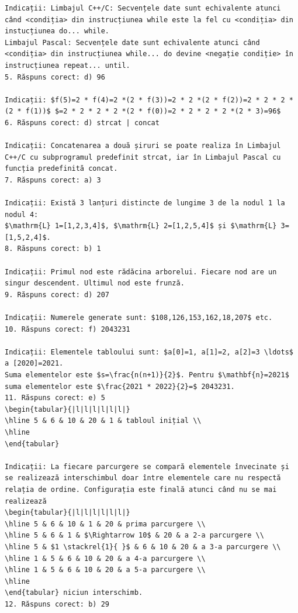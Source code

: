 \documentclass[10pt]{article}
\begin{document}
\begin{verbatim}
Indicații: Limbajul C++/C: Secvențele date sunt echivalente atunci când <condiția> din instrucțiunea while este la fel cu <condiția> din instucțiunea do... while.
Limbajul Pascal: Secvențele date sunt echivalente atunci când <condiția> din instrucțiunea while... do devine <negație condiție> în instrucțiunea repeat... until.
5. Răspuns corect: d) 96

Indicații: $f(5)=2 * f(4)=2 *(2 * f(3))=2 * 2 *(2 * f(2))=2 * 2 * 2 *(2 * f(1))$ $=2 * 2 * 2 * 2 *(2 * f(0))=2 * 2 * 2 * 2 *(2 * 3)=96$
6. Răspuns corect: d) strcat | concat

Indicații: Concatenarea a două șiruri se poate realiza în Limbajul C++/C cu subprogramul predefinit strcat, iar în Limbajul Pascal cu funcția predefinită concat.
7. Răspuns corect: a) 3

Indicații: Există 3 lanțuri distincte de lungime 3 de la nodul 1 la nodul 4:
$\mathrm{L} 1=[1,2,3,4]$, $\mathrm{L} 2=[1,2,5,4]$ și $\mathrm{L} 3=[1,5,2,4]$.
8. Răspuns corect: b) 1

Indicații: Primul nod este rădăcina arborelui. Fiecare nod are un singur descendent. Ultimul nod este frunză.
9. Răspuns corect: d) 207

Indicații: Numerele generate sunt: $108,126,153,162,18,207$ etc.
10. Răspuns corect: f) 2043231

Indicații: Elementele tabloului sunt: $a[0]=1, a[1]=2, a[2]=3 \ldots$ a [2020]=2021.
Suma elementelor este $s=\frac{n(n+1)}{2}$. Pentru $\mathbf{n}=2021$ suma elementelor este $\frac{2021 * 2022}{2}=$ 2043231.
11. Răspuns corect: e) 5
\begin{tabular}{|l|l|l|l|l|l|}
\hline 5 & 6 & 10 & 20 & 1 & tabloul inițial \\
\hline
\end{tabular}

Indicații: La fiecare parcurgere se compară elementele învecinate și se realizează interschimbul doar între elementele care nu respectă relația de ordine. Configurația este finală atunci când nu se mai realizează
\begin{tabular}{|l|l|l|l|l|l|}
\hline 5 & 6 & 10 & 1 & 20 & prima parcurgere \\
\hline 5 & 6 & 1 & $\Rightarrow 10$ & 20 & a 2-a parcurgere \\
\hline 5 & $1 \stackrel{1}{ }$ & 6 & 10 & 20 & a 3-a parcurgere \\
\hline 1 & 5 & 6 & 10 & 20 & a 4-a parcurgere \\
\hline 1 & 5 & 6 & 10 & 20 & a 5-a parcurgere \\
\hline
\end{tabular} niciun interschimb.
12. Răspuns corect: b) 29


\end{verbatim}
\end{document}
